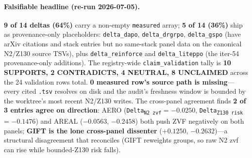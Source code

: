 \paragraph{Falsifiable headline (re-run 2026-07-05).}
\textbf{9 of 14 deltas (64\%)} carry a non-empty \texttt{measured}
array; \textbf{5 of 14 (36\%)} ship as provenance-only
placeholders: \texttt{delta\_dapo}, \texttt{delta\_drgrpo},
\texttt{delta\_gspo} (have arXiv citations and stack entries but no
same-stack panel data on the canonical N2/Z130 source TSVs), plus
\texttt{delta\_reinforce} and \texttt{delta\_liteppo} (the iter-54
provenance-only additions). The registry-wide \texttt{claim\_validation}
tally is \textbf{10 SUPPORTS, 2 CONTRADICTS, 4 NEUTRAL, 8 UNCLAIMED}
across the 24 validation rows total. \textbf{0 measured row's source
path is missing}---every cited \texttt{.tsv} resolves on disk and
the audit's freshness window is bounded by the worktree's most recent
N2/Z130 writes. The cross-panel agreement finds \textbf{2 of 3 entries
agree on direction}: AERO (\texttt{Delta\textsubscript{N2 zvf}} =
$-0.0250$, \texttt{Delta\textsubscript{Z130 risk}} = $-0.1476$)
and AREAL ($-0.0563$, $-0.2458$) both push ZVF negatively on both
panels; \textbf{GIFT is the lone cross-panel dissenter}
($+0.1250$, $-0.2632$)---a structural disagreement that
 reconciles (GIFT reweights groups, so raw
N2 zvf can rise while bounded-Z130 risk falls).

